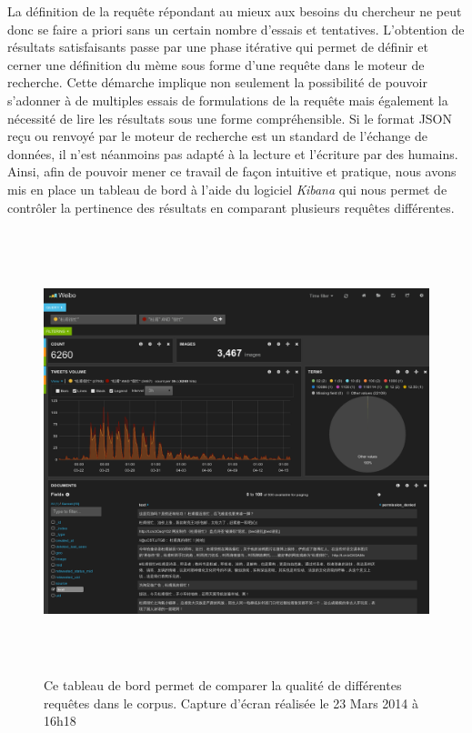     La définition de la requête répondant au mieux aux besoins du chercheur  ne peut donc se faire a priori sans un certain nombre d'essais et tentatives. L'obtention de résultats satisfaisants passe par une phase itérative qui permet de définir et cerner une définition du mème sous forme d'une requête dans le moteur de recherche. Cette démarche implique non seulement la possibilité de pouvoir s'adonner à de multiples essais de formulations de la requête mais également la nécessité de lire les résultats sous une forme compréhensible. Si le format JSON reçu ou renvoyé par le moteur de recherche est un standard de l'échange de données, il n'est néanmoins pas adapté à la lecture et l'écriture par des humains. Ainsi, afin de pouvoir mener ce travail de façon intuitive et pratique, nous avons mis en place un tableau de bord à l'aide du logiciel \textit{Kibana} qui nous permet de contr\^oler la pertinence des résultats en comparant plusieurs requêtes différentes.

    \begin{figure}[h!]
        \centering
        \includegraphics[width=6.0004in,height=5.078in]{figures/chap4/ui/ui-kibana.png}
        \caption[Tableau de bords requêtes par mots-clés] { Ce tableau de bord permet de comparer la qualité de différentes requ\^etes dans le corpus. Capture d'écran réalisée le 23 Mars 2014 à 16h18}
    \end{figure}


